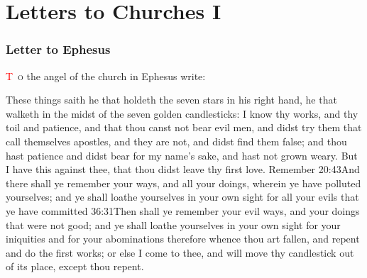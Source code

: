 \chapter{Letters to Churches I}
\subsection*{Letter to Ephesus}
\lettrine[lines=3]{\textcolor{red}{T}}{\ o} the angel of the church in Ephesus write:

\zz These things saith he that holdeth the seven stars in his right hand, he that walketh in the midst of the seven golden candlesticks:%
I know thy works, and thy toil and patience, and that thou canst not bear evil men, and didst try them that call themselves apostles, and they are not, and didst find them false; %
and thou hast patience and didst bear for my name’s sake, and hast not grown weary. %
But I have this against thee, that thou didst leave thy first love.%
Remember%
				{20:43}{And there shall ye remember your ways, and all your doings, wherein ye have polluted yourselves; and ye shall loathe yourselves in your own sight for all your evils that ye have committed}%
				{36:31}{Then shall ye remember your evil ways, and your doings that were not good; and ye shall loathe yourselves in your own sight for your iniquities and for your abominations} %
therefore whence thou art fallen, and repent and do the first works; or else I come to thee, and will move thy candlestick out of its place, except thou repent. %
